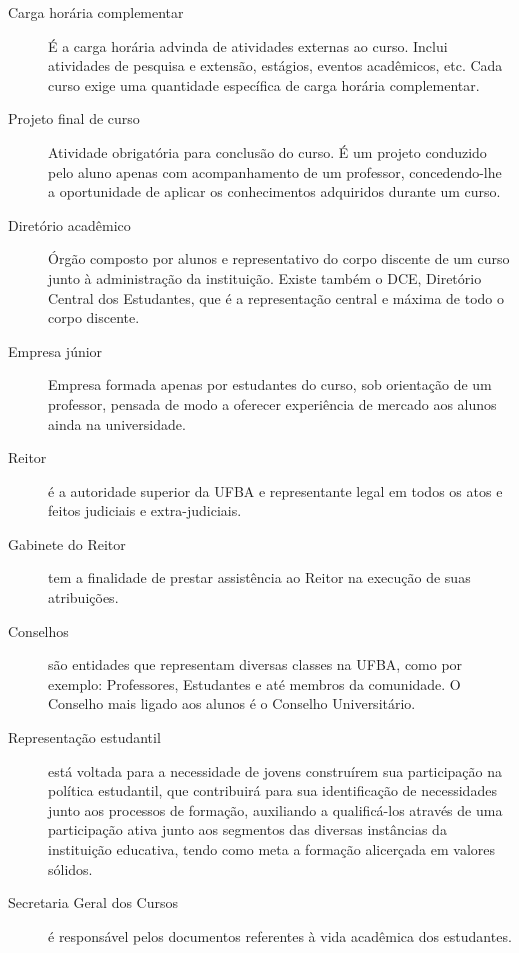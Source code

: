 \begin{description}
\item[Carga horária complementar] É a carga horária advinda de atividades externas ao curso. Inclui atividades de pesquisa e extensão, estágios, eventos acadêmicos, etc. Cada curso exige uma quantidade específica de carga horária complementar.
\item[Projeto final de curso] Atividade obrigatória para conclusão do curso. É um projeto conduzido pelo aluno apenas com acompanhamento de um professor, concedendo-lhe a oportunidade de aplicar os conhecimentos adquiridos durante um curso.
\item[Diretório acadêmico] Órgão composto por alunos e representativo do corpo discente de um curso junto à administração da instituição. Existe também o DCE, Diretório Central dos Estudantes, que é a representação central e máxima de todo o corpo discente.
\item[Empresa júnior] Empresa formada apenas por estudantes do curso, sob orientação de um professor, pensada de modo a oferecer experiência de mercado aos alunos ainda na universidade.

\item[Reitor] é a autoridade superior da UFBA e representante legal em todos os atos e feitos judiciais e extra-judiciais.

\item[Gabinete do Reitor] tem a finalidade de prestar assistência ao Reitor na execução de suas atribuições.

\item[Conselhos] são entidades que representam diversas classes na UFBA, como por exemplo: Professores, Estudantes e até membros da comunidade. O Conselho mais ligado aos alunos é o Conselho Universitário.

\item[Representação estudantil] está voltada para a necessidade de jovens construírem sua participação na política estudantil, que contribuirá para sua identificação de necessidades junto aos processos de formação, auxiliando a qualificá-los através de uma participação ativa junto aos segmentos das diversas instâncias da instituição educativa, tendo como meta a formação alicerçada em valores sólidos.

\item[Secretaria Geral dos Cursos] é responsável pelos documentos referentes à vida acadêmica dos estudantes.

\end{description}